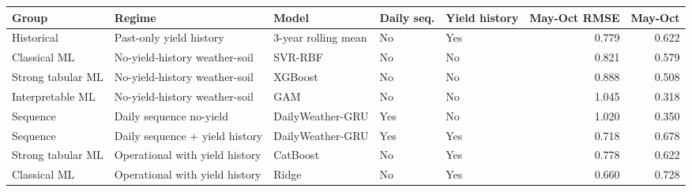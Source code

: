 \begin{tabular}{lllllrr}
\toprule
Group & Regime & Model & Daily seq. & Yield history & May-Oct RMSE & May-Oct \Rsq{} \\
\midrule
Historical & Past-only yield history & 3-year rolling mean & No & Yes & 0.779 & 0.622 \\
Classical ML & No-yield-history weather-soil & SVR-RBF & No & No & 0.821 & 0.579 \\
Strong tabular ML & No-yield-history weather-soil & XGBoost & No & No & 0.888 & 0.508 \\
Interpretable ML & No-yield-history weather-soil & GAM & No & No & 1.045 & 0.318 \\
Sequence & Daily sequence no-yield & DailyWeather-GRU & Yes & No & 1.020 & 0.350 \\
Sequence & Daily sequence + yield history & DailyWeather-GRU & Yes & Yes & 0.718 & 0.678 \\
Strong tabular ML & Operational with yield history & CatBoost & No & Yes & 0.778 & 0.622 \\
Classical ML & Operational with yield history & Ridge & No & Yes & 0.660 & 0.728 \\
\bottomrule
\end{tabular}

